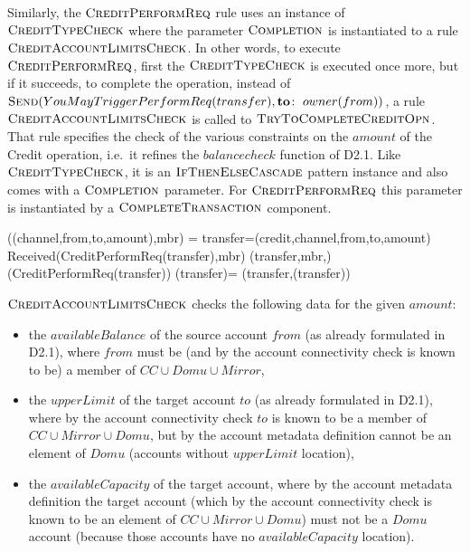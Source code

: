 Similarly, the $\hbox{\sc CreditPerformReq}$ rule uses an instance of  $\hbox{\sc CreditTypeCheck}$ where the parameter $\hbox{\sc Completion}$  is instantiated to a rule
$\hbox{\sc CreditAccountLimitsCheck}$. In other words, to execute $\hbox{\sc CreditPerformReq}$, first the $\hbox{\sc CreditTypeCheck}$ is executed once more, but if it succeeds, to complete the operation, instead of $\hbox{\sc Send} (YouMayTriggerPerformReq(transfer),\mathrel{\mathbf{to\colon}} owner(from))$, a rule $\hbox{\sc CreditAccountLimitsCheck}$ is called to $\hbox{\sc TryToCompleteCreditOpn}$. That rule specifies the check of the various constraints on the $amount$ of the Credit operation, i.e.\ it refines the $balancecheck$ function of D2.1. Like $\hbox{\sc CreditTypeCheck}$, it is an $\hbox{\sc IfThenElseCascade}$ pattern instance and also comes with a $\hbox{\sc Completion}$ parameter. For $\hbox{\sc CreditPerformReq}$ this parameter is instantiated by a $\hbox{\sc CompleteTransaction}$ component.

\begin{asm}
((channel,from,to,amount),mbr)  =\+
\LET transfer=(credit,channel,from,to,amount)\\
\IF Received(CreditPerformReq(transfer),\FROM mbr) \THEN \+  
  (transfer,mbr,)\\
   (CreditPerformReq(transfer))\-
\WHERE \+
  (transfer)=\+
     (transfer,(transfer))
\end{asm}

$\hbox{\sc CreditAccountLimitsCheck}$ checks the following data for the given $amount$:
\begin{itemize}
	\item the $availableBalance$ of the source account $from$ (as already formulated in D2.1), where $from$ must be (and by the account connectivity check is known to be) a member of $CC \cup Domu \cup Mirror$,
	
	\item the $upperLimit$ of the target account $to$ (as already formulated in D2.1), where by the account connectivity check $to$ is known to be a member of $CC \cup  Mirror \cup Domu$, but by the account metadata definition cannot be an element of $Domu$ (accounts without $upperLimit$ location), 
	 
	 \item the $availableCapacity$ of the target account, where by the account metadata definition the target account (which by the account connectivity check is known to be an element of $CC \cup  Mirror \cup Domu$) must not be a $Domu$ account (because those accounts have no $availableCapacity$ location).
 \end{itemize} 

